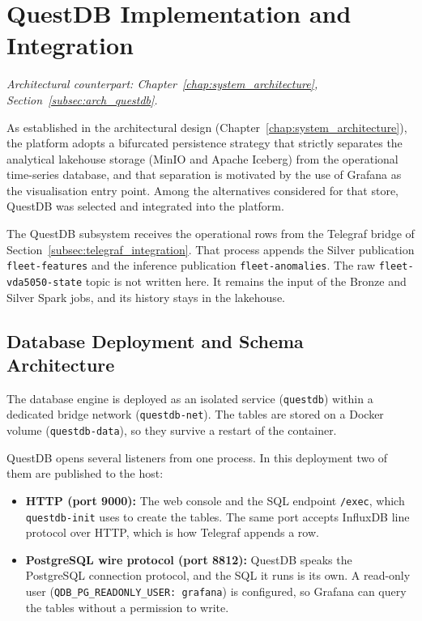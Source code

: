 \section{QuestDB Implementation and Integration}
\label{sec:questdb-implementation}
\textit{Architectural counterpart: Chapter~\ref{chap:system_architecture}, Section~\ref{subsec:arch_questdb}.}

As established in the architectural design (Chapter~\ref{chap:system_architecture}), the platform adopts a bifurcated persistence strategy that strictly separates the analytical lakehouse storage (MinIO and Apache Iceberg) from the operational time-series database, and that separation is motivated by the use of Grafana as the visualisation entry point. Among the alternatives considered for that store, QuestDB was selected and integrated into the platform.

The QuestDB subsystem receives the operational rows from the Telegraf bridge of Section~\ref{subsec:telegraf_integration}. That process appends the Silver publication \texttt{fleet-features} and the inference publication \texttt{fleet-anomalies}. The raw \texttt{fleet-vda5050-state} topic is not written here. It remains the input of the Bronze and Silver Spark jobs, and its history stays in the lakehouse.

\subsection{Database Deployment and Schema Architecture}
\label{subsec:questdb-deployment-schema}

The database engine is deployed as an isolated service (\texttt{questdb}) within a dedicated bridge network (\texttt{questdb-net}). The tables are stored on a Docker volume (\texttt{questdb-data}), so they survive a restart of the container.

QuestDB opens several listeners from one process. In this deployment two of them are published to the host:
\begin{itemize}
    \item \textbf{HTTP (port 9000):} The web console and the SQL endpoint \texttt{/exec}, which \texttt{questdb-init} uses to create the tables. The same port accepts InfluxDB line protocol over HTTP, which is how Telegraf appends a row.
    \item \textbf{PostgreSQL wire protocol (port 8812):} QuestDB speaks the PostgreSQL connection protocol, and the SQL it runs is its own. A read-only user (\texttt{QDB\_PG\_READONLY\_USER: grafana}) is configured, so Grafana can query the tables without a permission to write.
\end{itemize}

